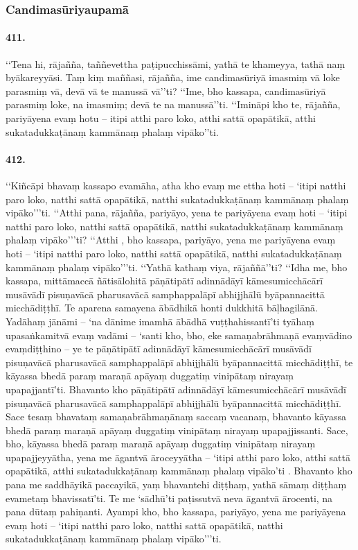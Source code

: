 \subsubsection{Candimasūriyaupamā}

\paragraph{411.} ‘‘Tena hi, rājañña, taññevettha paṭipucchissāmi, yathā te khameyya, tathā naṃ byākareyyāsi. Taṃ kiṃ maññasi, rājañña, ime candimasūriyā imasmiṃ vā loke parasmiṃ vā, devā vā te manussā vā’’ti? ‘‘Ime, bho kassapa, candimasūriyā parasmiṃ loke, na imasmiṃ; devā te na manussā’’ti. ‘‘Imināpi kho te, rājañña, pariyāyena evaṃ hotu – itipi atthi paro loko, atthi sattā opapātikā, atthi sukatadukkaṭānaṃ kammānaṃ phalaṃ vipāko’’ti.

\paragraph{412.} ‘‘Kiñcāpi bhavaṃ kassapo evamāha, atha kho evaṃ me ettha hoti – ‘itipi natthi paro loko, natthi sattā opapātikā, natthi sukatadukkaṭānaṃ kammānaṃ phalaṃ vipāko’’’ti. ‘‘Atthi pana, rājañña, pariyāyo, yena te pariyāyena evaṃ hoti – ‘itipi natthi paro loko, natthi sattā opapātikā, natthi sukatadukkaṭānaṃ kammānaṃ phalaṃ vipāko’’’ti? ‘‘Atthi , bho kassapa, pariyāyo, yena me pariyāyena evaṃ hoti – ‘itipi natthi paro loko, natthi sattā opapātikā, natthi sukatadukkaṭānaṃ kammānaṃ phalaṃ vipāko’’’ti. ‘‘Yathā kathaṃ viya, rājaññā’’ti? ‘‘Idha me, bho kassapa, mittāmaccā ñātisālohitā pāṇātipātī adinnādāyī kāmesumicchācārī musāvādī pisuṇavācā pharusavācā samphappalāpī abhijjhālū byāpannacittā micchādiṭṭhī. Te aparena samayena ābādhikā honti dukkhitā bāḷhagilānā. Yadāhaṃ jānāmi – ‘na dānime imamhā ābādhā vuṭṭhahissantī’ti tyāhaṃ upasaṅkamitvā evaṃ vadāmi – ‘santi kho, bho, eke samaṇabrāhmaṇā evaṃvādino evaṃdiṭṭhino – ye te pāṇātipātī adinnādāyī kāmesumicchācārī musāvādī pisuṇavācā pharusavācā samphappalāpī abhijjhālū byāpannacittā micchādiṭṭhī, te kāyassa bhedā paraṃ maraṇā apāyaṃ duggatiṃ vinipātaṃ nirayaṃ upapajjantī’ti. Bhavanto kho pāṇātipātī adinnādāyī kāmesumicchācārī musāvādī pisuṇavācā pharusavācā samphappalāpī abhijjhālū byāpannacittā micchādiṭṭhī. Sace tesaṃ bhavataṃ samaṇabrāhmaṇānaṃ saccaṃ vacanaṃ, bhavanto kāyassa bhedā paraṃ maraṇā apāyaṃ duggatiṃ vinipātaṃ nirayaṃ upapajjissanti. Sace, bho, kāyassa bhedā paraṃ maraṇā apāyaṃ duggatiṃ vinipātaṃ nirayaṃ upapajjeyyātha, yena me āgantvā āroceyyātha – ‘itipi atthi paro loko, atthi sattā opapātikā, atthi sukatadukkaṭānaṃ kammānaṃ phalaṃ vipāko’ti . Bhavanto kho pana me saddhāyikā paccayikā, yaṃ bhavantehi diṭṭhaṃ, yathā sāmaṃ diṭṭhaṃ evametaṃ bhavissatī’ti. Te me ‘sādhū’ti paṭissutvā neva āgantvā ārocenti, na pana dūtaṃ pahiṇanti. Ayampi kho, bho kassapa, pariyāyo, yena me pariyāyena evaṃ hoti – ‘itipi natthi paro loko, natthi sattā opapātikā, natthi sukatadukkaṭānaṃ kammānaṃ phalaṃ vipāko’’’ti.

